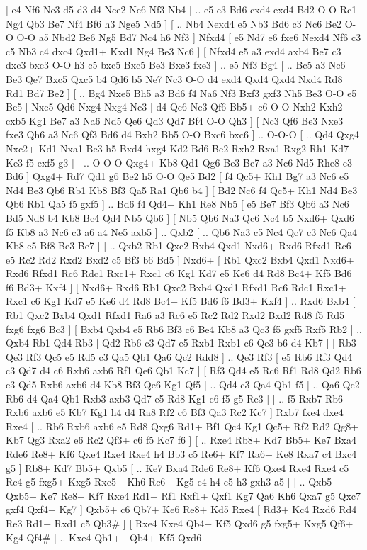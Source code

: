 \makegametitle 
|   e4   Nf6    Nc3   d5    d3   d4    Nce2   Nc6    Nf3   Nb4 [ .. e5  c3 Bd6  cxd4 exd4  Bd2 O-O  Rc1 Ng4  Qb3 Be7  Nf4 Bf6  h3 Nge5  Nd5   ]  [ .. Nb4  Nexd4 e5  Nb3 Bd6  c3 Nc6  Be2 O-O  O-O a5  Nbd2 Be6  Ng5 Bd7  Nc4 h6  Nf3   ]  Nfxd4 [  e5 Nd7  e6 fxe6  Nexd4 Nf6  c3 c5  Nb3 c4  dxc4 Qxd1+  Kxd1 Ng4  Be3 Nc6   ]  [  Nfxd4 e5  a3 exd4  axb4 Be7  c3 dxc3  bxc3 O-O  h3 c5  bxc5 Bxc5  Be3 Bxe3  fxe3   ] .. e5    Nf3   Bg4 [ .. Bc5  a3 Nc6  Be3 Qe7  Bxc5 Qxc5  b4 Qd6  b5 Ne7  Nc3 O-O  d4 exd4  Qxd4 Qxd4  Nxd4 Rd8  Rd1 Bd7  Be2   ]  [ .. Bg4  Nxe5 Bh5  a3 Bd6  f4 Na6  Nf3 Bxf3  gxf3 Nh5  Be3 O-O  e5 Bc5   ]  Nxe5   Qd6    Nxg4   Nxg4    Nc3 [  d4 Qc6  Nc3 Qf6  Bb5+ c6  O-O Nxh2  Kxh2 cxb5  Kg1 Be7  a3 Na6  Nd5 Qe6  Qd3 Qd7  Bf4 O-O  Qh3   ]  [  Nc3 Qf6  Be3 Nxe3  fxe3 Qh6  a3 Nc6  Qf3 Bd6  d4 Bxh2  Bb5 O-O  Bxc6 bxc6   ] .. O-O-O [ .. Qd4  Qxg4 Nxc2+  Kd1 Nxa1  Be3 h5  Bxd4 hxg4  Kd2 Bd6  Be2 Rxh2  Rxa1 Rxg2  Rh1 Kd7  Ke3 f5  exf5 g3   ]  [ .. O-O-O  Qxg4+ Kb8  Qd1 Qg6  Be3 Be7  a3 Nc6  Nd5 Rhe8  c3 Bd6   ]  Qxg4+   Rd7    Qd1   g6    Be2   h5    O-O   Qe5    Bd2 [  f4 Qc5+  Kh1 Bg7  a3 Nc6  e5 Nd4  Be3 Qb6  Rb1 Kb8  Bf3 Qa5  Ra1 Qb6  b4   ]  [  Bd2 Nc6  f4 Qc5+  Kh1 Nd4  Be3 Qb6  Rb1 Qa5  f5 gxf5   ] .. Bd6    f4   Qd4+    Kh1   Re8    Nb5 [  e5 Be7  Bf3 Qb6  a3 Nc6  Bd5 Nd8  b4 Kb8  Bc4 Qd4  Nb5 Qb6   ]  [  Nb5 Qb6  Na3 Qc6  Nc4 b5  Nxd6+ Qxd6  f5 Kb8  a3 Nc6  c3 a6  a4 Ne5  axb5   ] .. Qxb2 [ .. Qb6  Na3 c5  Nc4 Qc7  c3 Nc6  Qa4 Kb8  e5 Bf8  Be3 Be7   ]  [ .. Qxb2  Rb1 Qxc2  Bxb4 Qxd1  Nxd6+ Rxd6  Rfxd1 Rc6  e5 Rc2  Rd2 Rxd2  Bxd2 c5  Bf3 b6  Bd5   ]  Nxd6+ [  Rb1 Qxc2  Bxb4 Qxd1  Nxd6+ Rxd6  Rfxd1 Rc6  Rdc1 Rxc1+  Rxc1 c6  Kg1 Kd7  e5 Ke6  d4 Rd8  Bc4+ Kf5  Bd6 f6  Bd3+ Kxf4   ]  [  Nxd6+ Rxd6  Rb1 Qxc2  Bxb4 Qxd1  Rfxd1 Rc6  Rdc1 Rxc1+  Rxc1 c6  Kg1 Kd7  e5 Ke6  d4 Rd8  Bc4+ Kf5  Bd6 f6  Bd3+ Kxf4   ] .. Rxd6    Bxb4 [  Rb1 Qxc2  Bxb4 Qxd1  Rfxd1 Ra6  a3 Rc6  e5 Rc2  Rd2 Rxd2  Bxd2 Rd8  f5 Rd5  fxg6 fxg6  Bc3   ]  [  Bxb4 Qxb4  e5 Rb6  Bf3 c6  Be4 Kb8  a3 Qc3  f5 gxf5  Rxf5 Rb2   ] .. Qxb4    Rb1   Qd4    Rb3 [  Qd2 Rb6  c3 Qd7  e5 Rxb1  Rxb1 c6  Qe3 b6  d4 Kb7   ]  [  Rb3 Qe3  Rf3 Qc5  e5 Rd5  c3 Qa5  Qb1 Qa6  Qc2 Rdd8   ] .. Qe3    Rf3 [  e5 Rb6  Rf3 Qd4  c3 Qd7  d4 c6  Rxb6 axb6  Rf1 Qe6  Qb1 Kc7   ]  [  Rf3 Qd4  e5 Rc6  Rf1 Rd8  Qd2 Rb6  c3 Qd5  Rxb6 axb6  d4 Kb8  Bf3 Qe6  Kg1 Qf5   ] .. Qd4    c3   Qa4    Qb1   f5 [ .. Qa6  Qc2 Rb6  d4 Qa4  Qb1 Rxb3  axb3 Qd7  e5 Rd8  Kg1 c6  f5 g5  Re3   ]  [ .. f5  Rxb7 Rb6  Rxb6 axb6  e5 Kb7  Kg1 h4  d4 Ra8  Rf2 c6  Bf3 Qa3  Rc2 Kc7   ]  Rxb7   fxe4    dxe4   Rxe4 [ .. Rb6  Rxb6 axb6  e5 Rd8  Qxg6 Rd1+  Bf1 Qc4  Kg1 Qc5+  Rf2 Rd2  Qg8+ Kb7  Qg3 Rxa2  e6 Rc2  Qf3+ c6  f5 Kc7  f6   ]  [ .. Rxe4  Rb8+ Kd7  Bb5+ Ke7  Bxa4 Rde6  Re8+ Kf6  Qxe4 Rxe4  Rxe4 h4  Bb3 c5  Re6+ Kf7  Ra6+ Ke8  Rxa7 c4  Bxc4 g5   ]  Rb8+   Kd7   Bb5+   Qxb5 [ .. Ke7  Bxa4 Rde6  Re8+ Kf6  Qxe4 Rxe4  Rxe4 c5  Rc4 g5  fxg5+ Kxg5  Rxc5+ Kh6  Rc6+ Kg5  c4 h4  c5 h3  gxh3 a5   ]  [ .. Qxb5  Qxb5+ Ke7  Re8+ Kf7  Rxe4 Rd1+  Rf1 Rxf1+  Qxf1 Kg7  Qa6 Kh6  Qxa7 g5  Qxc7 gxf4  Qxf4+ Kg7   ]  Qxb5+   c6    Qb7+   Ke6   Re8+   Kd5    Rxe4 [  Rd3+ Kc4  Rxd6 Rd4  Re3 Rd1+  Rxd1 c5  Qb3#   ]  [  Rxe4 Kxe4  Qb4+ Kf5  Qxd6 g5  fxg5+ Kxg5  Qf6+ Kg4  Qf4#   ] .. Kxe4    Qb1+ [  Qb4+ Kf5  Qxd6 
